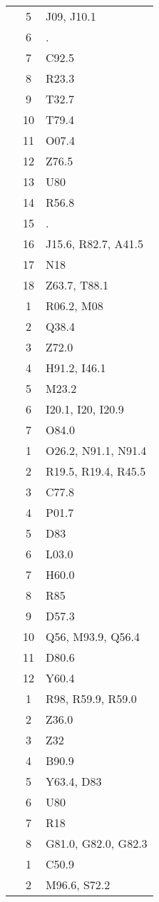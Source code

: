 \begin{table}[htbp]
\begin{tabular}{c c l}
	 & 5 & J09, J10.1 \\
	 & 6 & . \\
	 & 7 & C92.5 \\
	 & 8 & R23.3 \\
	 & 9 & T32.7 \\
	 & 10 & T79.4 \\
	 & 11 & O07.4 \\
	 & 12 & Z76.5 \\
	 & 13 & U80 \\
	 & 14 & R56.8 \\
	 & 15 & . \\
	 & 16 & J15.6, R82.7, A41.5 \\
	 & 17 & N18 \\
	 & 18 & Z63.7, T88.1 \\
	\addlinespace
	4 & 1 & R06.2, M08 \\
	 & 2 & Q38.4 \\
	 & 3 & Z72.0 \\
	 & 4 & H91.2, I46.1 \\
	 & 5 & M23.2 \\
	 & 6 & I20.1, I20, I20.9 \\
	 & 7 & O84.0 \\
	\addlinespace
	5 & 1 & O26.2, N91.1, N91.4 \\
	 & 2 & R19.5, R19.4, R45.5 \\
	 & 3 & C77.8 \\
	 & 4 & P01.7 \\
	 & 5 & D83 \\
	 & 6 & L03.0 \\
	 & 7 & H60.0 \\
	 & 8 & R85 \\
	 & 9 & D57.3 \\
	 & 10 & Q56, M93.9, Q56.4 \\
	 & 11 & D80.6 \\
	 & 12 & Y60.4 \\
	\addlinespace
	6 & 1 & R98, R59.9, R59.0 \\
	 & 2 & Z36.0 \\
	 & 3 & Z32 \\
	 & 4 & B90.9 \\
	 & 5 & Y63.4, D83 \\
	 & 6 & U80 \\
	 & 7 & R18 \\
	 & 8 & G81.0, G82.0, G82.3 \\
	\addlinespace
	7 & 1 & C50.9 \\
	 & 2 & M96.6, S72.2 \\

\end{tabular}
\end{table}

